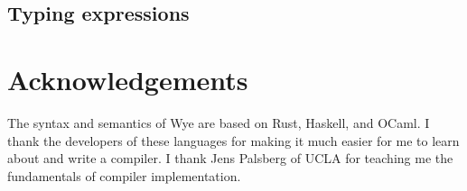 \documentclass[a4paper, 12pt]{article}
\begin{document}
\subsection{Typing expressions}




\pagebreak
\section{Acknowledgements}
The syntax and semantics of Wye are based on Rust, Haskell, and OCaml. I thank the developers of these languages for making it much easier for me to learn about and write a compiler. I thank Jens Palsberg of UCLA for teaching me the fundamentals of compiler implementation.

\pagebreak



\end{document}
